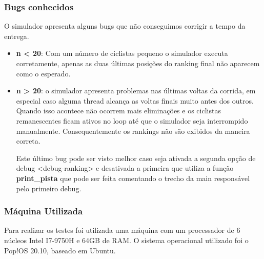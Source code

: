 \documentclass{beamer}
\begin{document}
\begin{frame}
\frametitle{Bugs conhecidos}
O simulador apresenta alguns bugs que não conseguimos corrigir a tempo da entrega. 

\begin{itemize}
\item \textbf{n < 20}: Com um número de ciclistas pequeno o simulador executa corretamente, apenas as duas últimas
    posições do ranking final não aparecem como o esperado.

\item \textbf{n > 20}: o simulador apresenta problemas nas últimas voltas da corrida, em especial caso alguma thread
    alcança as voltas finais muito antes dos outros. Quando isso acontece não ocorrem mais eliminações e os ciclistas
        remanescentes ficam ativos no loop até que o simulador seja interrompido manualmente. Consequentemente os
        rankings não são exibidos da maneira correta. 

Este último bug pode ser visto melhor caso seja ativada a segunda opção de debug <debug-ranking> e desativada a primeira
        que utiliza a função \textbf{print\_pista} que pode ser feita comentando o trecho da main responsável pelo
        primeiro debug.

\end{itemize}

\end{frame}


\begin{frame}
\frametitle{Máquina Utilizada}
Para realizar os testes foi utilizada uma máquina com um processador de 6 núcleos Intel I7-9750H e 64GB de RAM. O
    sistema operacional utilizado foi o Pop!OS 20.10, baseado em Ubuntu.

\end{frame}
\end{document}
